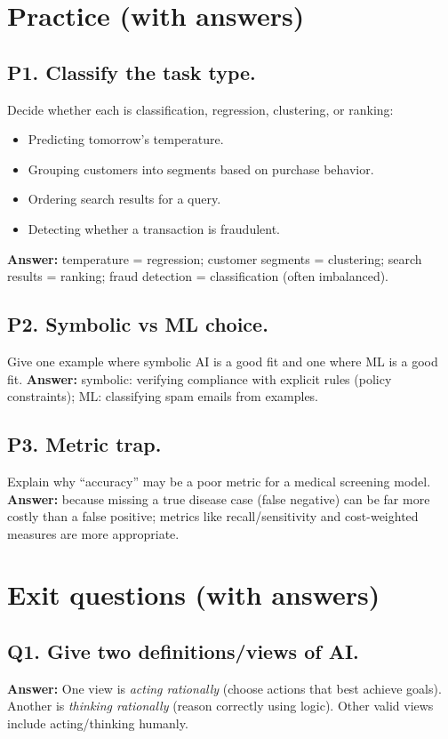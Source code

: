 \documentclass[11pt]{article}
\begin{document}
\section{Practice (with answers)}

\subsection*{P1. Classify the task type.}
Decide whether each is classification, regression, clustering, or ranking:
\begin{itemize}[leftmargin=*]
  \item Predicting tomorrow's temperature.
  \item Grouping customers into segments based on purchase behavior.
  \item Ordering search results for a query.
  \item Detecting whether a transaction is fraudulent.
\end{itemize}
\textbf{Answer:} temperature = regression; customer segments = clustering; search results = ranking; fraud detection = classification (often imbalanced).

\subsection*{P2. Symbolic vs ML choice.}
Give one example where symbolic AI is a good fit and one where ML is a good fit.
\textbf{Answer:} symbolic: verifying compliance with explicit rules (policy constraints); ML: classifying spam emails from examples.

\subsection*{P3. Metric trap.}
Explain why ``accuracy'' may be a poor metric for a medical screening model.
\textbf{Answer:} because missing a true disease case (false negative) can be far more costly than a false positive; metrics like recall/sensitivity and cost-weighted measures are more appropriate.

\section{Exit questions (with answers)}

\subsection*{Q1. Give two definitions/views of AI.}
\textbf{Answer:} One view is \emph{acting rationally} (choose actions that best achieve goals). Another is \emph{thinking rationally} (reason correctly using logic). Other valid views include acting/thinking humanly.
\end{document}
